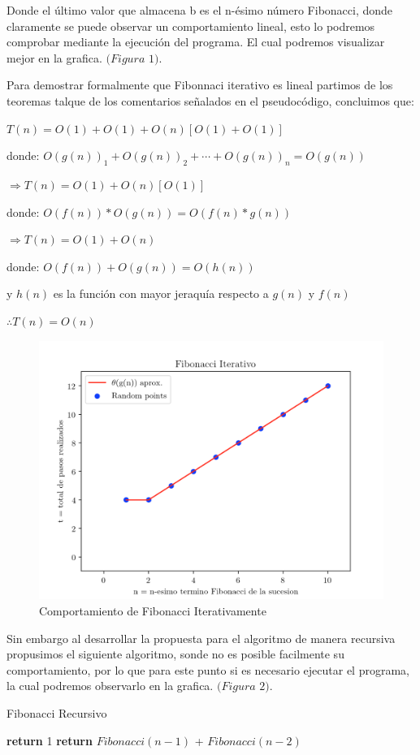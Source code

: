 \documentclass[12pt,twoside]{article}
\begin{document}
Donde el \'ultimo valor que almacena b es el n-\'esimo n\'umero Fibonacci, donde claramente se puede observar un comportamiento lineal,
esto lo podremos comprobar mediante la ejecuci\'on del programa. El cual podremos visualizar mejor en la grafica. $(Figura$ $1)$.

Para demostrar formalmente que Fibonnaci iterativo es lineal partimos de los teoremas talque de los comentarios señalados en el 
pseudoc\'odigo, concluimos que:

\centerline{$T(n) = O(1)+O(1)+O(n)[O(1) + O(1)]$}
\centerline{}
\centerline{donde: $O(g(n))_{1} + O(g(n))_{2}+\cdots+O(g(n))_n = O(g(n))$}
\centerline{}
\centerline{$\Rightarrow T(n) = O(1) + O(n)[O(1)]$}
\centerline{}
\centerline{donde: $O(f(n)) * O(g(n))= O(f(n)*g(n))$}
\centerline{}
\centerline{$\Rightarrow T(n) = O(1) + O(n)$}
\centerline{}
\centerline{donde: $O(f(n)) + O(g(n)) = O(h(n))$}
\centerline{y $h(n)$ es la funci\'on con mayor jeraqu\'ia respecto a $g(n)$ y $f(n)$}
\centerline{}
\centerline{$\therefore T(n) = O(n)$}

\begin{figure}
  \centering
    \includegraphics[height=0.5\textwidth]{Figure1}
  \caption{Comportamiento de Fibonacci Iterativamente}
  \label{fig:ejemplo1}
\end{figure}

Sin embargo al desarrollar la propuesta para el algoritmo de manera recursiva propusimos el siguiente algoritmo, sonde no es posible
facilmente su comportamiento, por lo que para este punto si es necesario ejecutar el programa, la cual podremos observarlo en la grafica. 
$(Figura$ $2)$.

\begin{algorithm}
  \caption{Fibonacci Recursivo}\label{euclid}
  \begin{algorithmic}[1]
        \State \textbf{return} 1
      \EndIf
      \State \textbf{return} $Fibonacci(n-1)$ + $Fibonacci(n-2)$
  \EndFunction
  \end{algorithmic}
\end{algorithm}
\end{document}

